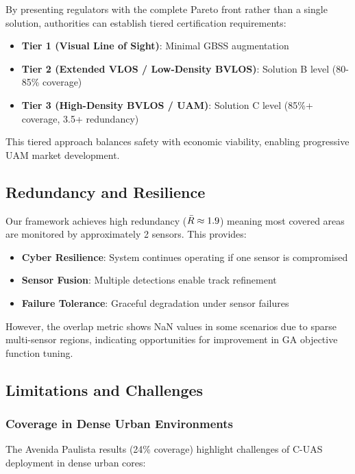 By presenting regulators with the complete Pareto front rather than a single solution, authorities can establish tiered certification requirements:

\begin{itemize}
\item \textbf{Tier 1 (Visual Line of Sight)}: Minimal GBSS augmentation
\item \textbf{Tier 2 (Extended VLOS / Low-Density BVLOS)}: Solution B level (80-85\% coverage)
\item \textbf{Tier 3 (High-Density BVLOS / UAM)}: Solution C level (85\%+ coverage, 3.5+ redundancy)
\end{itemize}

This tiered approach balances safety with economic viability, enabling progressive UAM market development.

\subsection{Redundancy and Resilience}

Our framework achieves high redundancy ($\bar{R} \approx 1.9$) meaning most covered areas are monitored by approximately 2 sensors. This provides:

\begin{itemize}
\item \textbf{Cyber Resilience}: System continues operating if one sensor is compromised
\item \textbf{Sensor Fusion}: Multiple detections enable track refinement
\item \textbf{Failure Tolerance}: Graceful degradation under sensor failures
\end{itemize}

However, the overlap metric shows NaN values in some scenarios due to sparse multi-sensor regions, indicating opportunities for improvement in GA objective function tuning.

\subsection{Limitations and Challenges}

\subsubsection{Coverage in Dense Urban Environments}

The Avenida Paulista results (24\% coverage) highlight challenges of C-UAS deployment in dense urban cores:

